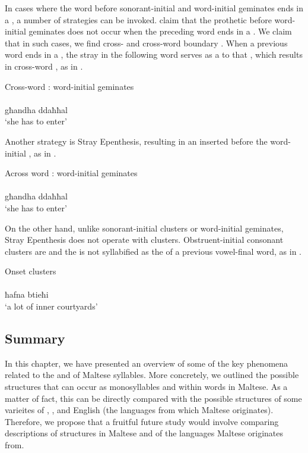 \documentclass[output=paper]{langsci/langscibook}
\begin{document}
 In cases where the word before sonorant-initial and word-initial geminates ends in a , a number of strategies can be invoked. \citet{hoberman2003verbal} claim that the prothetic  before word-initial geminates does not occur when the preceding word ends in a . We claim that in such cases, we find cross- and cross-word boundary . When a previous word ends in a , the stray  in the following word serves as a  to that , which results in cross-word , as in .

\ea\label{ex:galea:20}
{Cross-word : word-initial geminates}\\
 \\
{għandha ddaħħal} \\
\glt ‘she has to enter’
\z

Another strategy is Stray Epenthesis, resulting in an inserted  before the word-initial , as in .

\ea\label{ex:galea:21}
{Across word : word-initial geminates}\\
 \\
{għandha ddaħħal} \\
\glt ‘she has to enter’
\z

On the other hand, unlike sonorant-initial clusters or word-initial geminates, Stray Epenthesis does not operate with  clusters. Ob\-stru\-ent-initial consonant clusters are  and the  is not syllabified as the  of a previous vowel-final word, as in .  

\ea\label{ex:galea:22}
{Onset clusters}\\
 \\
{ħafna btieħi} \\
\glt ‘a lot of inner courtyards’
 \z
 
 \subsection{Summary} %
In this chapter, we have presented an overview of some of the key phenomena related to the  and  of Maltese syllables. More concretely, we outlined the possible  structures that can occur as monosyllables and within words in Maltese. As a matter of fact, this can be directly compared with the possible  structures of some varieites of , , and English (the languages from which Maltese originates). Therefore, we propose that a fruitful future study would involve comparing descriptions of  structures in Maltese and of the languages Maltese originates from. 
\end{document}
